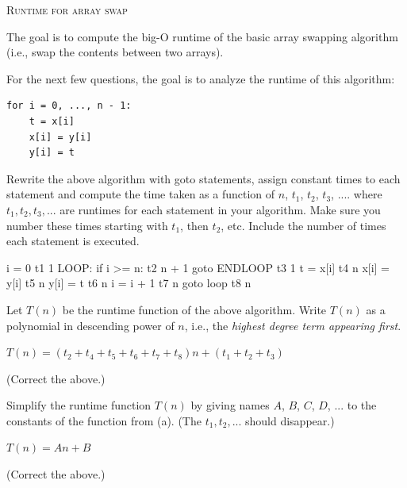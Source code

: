 

\LATEXHELPTHREEFIVEZERO

\TURNPAGE

\newpage
\textsc{Runtime for array swap}

The goal is to compute the big-O runtime of the basic array
swapping algorithm (i.e., swap the contents between two arrays).

For the next few questions,
the goal is to analyze the runtime of this algorithm:
\begin{Verbatim}[frame=single]
for i = 0, ..., n - 1:
    t = x[i]
    x[i] = y[i]
    y[i] = t
\end{Verbatim}

\nextq
Rewrite the above algorithm with
goto statements, assign constant times to each statement and
compute the time taken as a function of $n$, $t_1$, $t_2$, $t_3$, ....
where $t_1, t_2, t_3, ...$ are runtimes for each statement in your
algorithm. Make sure you
number these times starting with $t_1$, then
$t_2$, etc.
Include the number of times each statement is executed.
\\
\ANSWER
\begin{answercode}
          i = 0                   t1      1
LOOP:     if i >= n:              t2      n + 1
              goto ENDLOOP        t3      1
          t = x[i]                t4      n
          x[i] = y[i]             t5      n
          y[i] = t                t6      n
          i = i + 1               t7      n
          goto loop               t8      n
\end{answercode}

\nextq
Let $T(n)$ be the runtime function of the above algorithm.
Write $T(n)$ as a polynomial in descending power of $n$, i.e.,
the \textit{highest degree term appearing first}.
\\
\ANSWER
\begin{answerlong}
$T(n) = (t_{2} + t_{4} + t_{5} + t_{6} + t_{7} + t_{8})n + (t_{1} + t_{2} + t_{3})$
\end{answerlong}
(Correct the above.)

\nextq
Simplify the runtime function $T(n)$
by giving names $A$, $B$, $C$, $D$, ...
to the constants of the function from (a). (The $t_1, t_2, ...$ should
disappear.)
\\
\ANSWER
\begin{answerlong}
$T(n) = A n + B $
\end{answerlong}
(Correct the above.)

